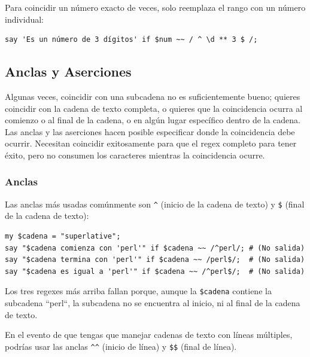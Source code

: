 Para coincidir un número exacto de veces, solo reemplaza el 
rango con un número individual:

\begin{verbatim}
say 'Es un número de 3 dígitos' if $num ~~ / ^ \d ** 3 $ /;
\end{verbatim}
%

\subsection{Anclas y Aserciones}

Algunas veces, coincidir con una subcadena no es suficientemente
bueno; quieres coincidir con la cadena de texto completa, 
o quieres que la coincidencia ocurra al comienzo o al final de la cadena,
o en algún lugar específico dentro de la cadena. Las anclas y las 
aserciones hacen posible especificar donde la coincidencia debe
ocurrir. Necesitan coincidir exitosamente para que el regex completo
para tener éxito, pero no consumen los caracteres mientras la 
coincidencia ocurre.

\subsubsection{Anclas}


Las anclas más usadas comúnmente son \verb|^| (inicio de la
cadena de texto) y \verb|$| (final de la cadena de texto):

\begin{verbatim}
my $cadena = "superlative";
say "$cadena comienza con 'perl'" if $cadena ~~ /^perl/; # (No salida)
say "$cadena termina con 'perl'" if $cadena ~~ /perl$/;  # (No salida)
say "$cadena es igual a 'perl'" if $cadena ~~ /^perl$/;  # (No salida)
\end{verbatim}

Los tres regexes más arriba fallan porque, aunque 
la \verb|$cadena| contiene la subcadena ``perl``, la
subcadena no se encuentra al inicio, ni al final de 
la cadena de texto.

En el evento de que tengas que manejar cadenas de texto con líneas
múltiples, podrías usar las anclas \verb|^^| (inicio de línea) y \verb|$$| 
(final de línea).

